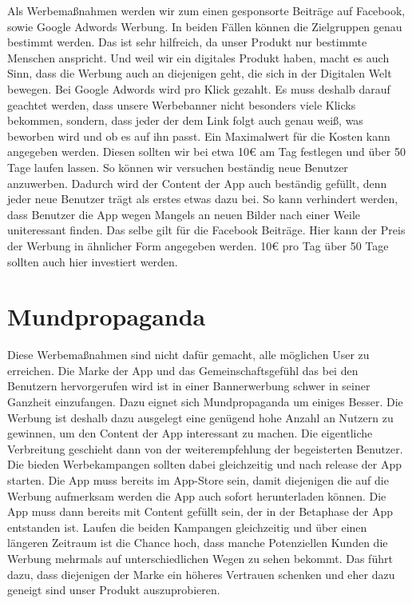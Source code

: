 Als Werbemaßnahmen werden wir zum einen gesponsorte Beiträge auf Facebook, sowie Google Adwords Werbung. In beiden Fällen können die Zielgruppen genau bestimmt werden. Das ist sehr hilfreich, da unser Produkt nur bestimmte Menschen anspricht. Und weil wir ein digitales Produkt haben, macht es auch Sinn, dass die Werbung auch an diejenigen geht, die sich in der Digitalen Welt bewegen.
Bei Google Adwords wird pro Klick gezahlt. Es muss deshalb darauf geachtet werden, dass unsere Werbebanner nicht besonders viele Klicks bekommen, sondern, dass jeder der dem Link folgt auch genau weiß, was beworben wird und ob es auf ihn passt. Ein Maximalwert für die Kosten kann angegeben werden. Diesen sollten wir bei etwa 10€ am Tag festlegen und über 50 Tage laufen lassen. So können wir versuchen beständig neue Benutzer anzuwerben. Dadurch wird der Content der App auch beständig gefüllt, denn jeder neue Benutzer trägt als erstes etwas dazu bei. So kann verhindert werden, dass Benutzer die App wegen Mangels an neuen Bilder nach einer Weile uniteressant finden.
Das selbe gilt für die Facebook Beiträge. Hier kann der Preis der Werbung in ähnlicher Form angegeben werden. 10€ pro Tag über 50 Tage sollten auch hier investiert werden.

\section{Mundpropaganda}

Diese Werbemaßnahmen sind nicht dafür gemacht, alle möglichen User zu erreichen. Die Marke der App und das Gemeinschaftsgefühl das bei den Benutzern hervorgerufen wird ist in einer Bannerwerbung schwer in seiner Ganzheit einzufangen. Dazu eignet sich Mundpropaganda um einiges Besser. Die Werbung ist deshalb dazu ausgelegt eine genügend hohe Anzahl an Nutzern zu gewinnen, um den Content der App interessant zu machen. Die eigentliche Verbreitung geschieht dann von der weiterempfehlung der begeisterten Benutzer.
Die bieden Werbekampangen sollten dabei gleichzeitig und nach release der App starten. Die App muss bereits im App-Store sein, damit diejenigen die auf die Werbung aufmerksam werden die App auch sofort herunterladen können. Die App muss dann bereits mit Content gefüllt sein, der in der Betaphase der App entstanden ist. Laufen die beiden Kampangen gleichzeitig und über einen längeren Zeitraum ist die Chance hoch, dass manche Potenziellen Kunden die Werbung mehrmals auf unterschiedlichen Wegen zu sehen bekommt. Das führt dazu, dass diejenigen der Marke ein höheres Vertrauen schenken und eher dazu geneigt sind unser Produkt auszuprobieren.